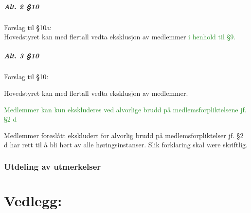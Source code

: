\documentclass[10pt,norsk,a4paper,usenames,dvipsnames]{article}
\begin{document}
        \subsubsection{Alt. 2 §10} 
            Forslag til §10a:
            \\Hovedstyret kan med  flertall vedta eksklusjon av medlemmer \textcolor{ForestGreen}{i henhold til §9.}
        \label{sec:10-half-full}


        \subsubsection{Alt. 3 §10} 
            Forslag til §10:
            \begin{enumerate}
            	\item Hovedstyret kan med  flertall vedta eksklusjon av medlemmer.
            	\textcolor{ForestGreen}{\item Medlemmer kan kun ekskluderes ved alvorlige brudd på medlemsforpliktelsene jf. §2 d}
            	\item Medlemmer foreslått ekskludert for alvorlig brudd på medlemsforpliktelser jf. §2 d har rett til å bli hørt av alle høringsinstanser. Slik forklaring skal være skriftlig.
            \end{enumerate}
        \label{sec:10-full}



\section{Utdeling av utmerkelser}


\part*{Vedlegg:}\label{lastpage}

\newpage
{}

\end{document}
